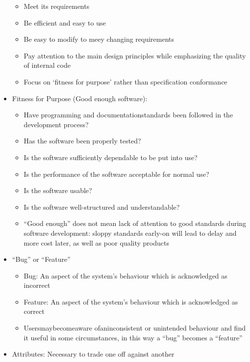 \documentclass[12pt,openany]{book}
\begin{document}
\begin{itemize}
    \begin{itemize}
        \item Meet its requirements
        \item Be efficient and easy to use
        \item Be easy to modify to meey changing requirements
        \item Pay attention to the main design principles while emphasizing the quality of internal code
        \item Focus on `fitness for purpose' rather than specification conformance
    \end{itemize}
    \item Fitness for Purpose (Good enough software):
    \begin{itemize}
        \item Have programming and documentationstandards been followed in the development process?
        \item Has the software been properly tested?
        \item Is the software sufficiently dependable to be put into use?
        \item Is the performance of the software acceptable for normal use?
        \item Is the software usable?
        \item Is the software well-structured and understandable?
        \item ``Good enough'' does not mean lack of attention to good standards during software development: sloppy standards early-on will lead to delay and more cost later, as well as poor quality products
    \end{itemize}
    \item ``Bug'' or ``Feature''
    \begin{itemize}
        \item Bug: An aspect of the system’s behaviour which is acknowledged as incorrect
        \item Feature: An aspect of the system’s behaviour which is acknowledged as correct
        \item Usersmaybecomeaware ofaninconsistent or unintended behaviour and find it useful in some circumstances, in this way a ``bug'' becomes a ``feature''
    \end{itemize}
    \item Attributes: Necessary to trade one off against another
    \begin{table}[H]
        \centering
        \begin{tabular}{lll}

\end{tabular}
\end{table}
\end{itemize}
\end{document}
